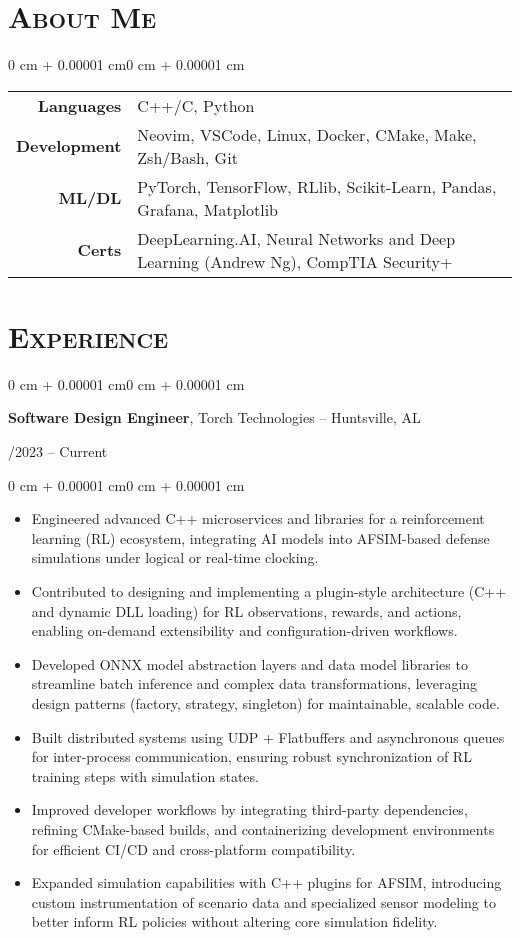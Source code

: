 \documentclass[11pt, letterpaper]{article}
\newenvironment{highlights}{
    \begin{itemize}[
        topsep=0.10 cm,
        parsep=0.10 cm,
        partopsep=0pt,
        itemsep=0pt,
        leftmargin=0.4 cm + 10pt
    ]
}{
    \end{itemize}
}
\newenvironment{onecolentry}{
    \begin{adjustwidth}{0 cm + 0.00001 cm}{0 cm + 0.00001 cm}
}{
    \end{adjustwidth}
}
\newenvironment{twocolentry}[1]{
    \onecolentry
    \def\secondColumn{#1}
    \setcolumnwidth{\fill,4.5cm}
    \begin{paracol}{2}
}{
    \switchcolumn \raggedleft \secondColumn
    \end{paracol}
    \endonecolentry
}
\begin{document}
\section{\scshape About Me}

\begin{onecolentry}
\begin{tabular}{@{}r l@{}}
\textbf{Languages} & C++/C, Python \\
\textbf{Development} & Neovim, VSCode, Linux, Docker, CMake, Make, Zsh/Bash, Git \\
\textbf{ML/DL} & PyTorch, TensorFlow, RLlib, Scikit-Learn, Pandas, Grafana, Matplotlib \\
\textbf{Certs} & DeepLearning.AI, Neural Networks and Deep Learning (Andrew Ng), CompTIA Security+ \\
\end{tabular}
\end{onecolentry}


\section{\scshape Experience}

\begin{twocolentry}{05/2023 – Current}
    \textbf{Software Design Engineer}, Torch Technologies -- Huntsville, AL
\end{twocolentry}

\vspace{0.10 cm}
\begin{onecolentry}
    \begin{highlights}
        \item Engineered advanced C++ microservices and libraries for a reinforcement learning (RL) ecosystem, integrating AI models into AFSIM-based defense simulations under logical or real-time clocking.
        \item Contributed to designing and implementing a plugin-style architecture (C++ and dynamic DLL loading) for RL observations, rewards, and actions, enabling on-demand extensibility and configuration-driven workflows.
        \item Developed ONNX model abstraction layers and data model libraries to streamline batch inference and complex data transformations, leveraging design patterns (factory, strategy, singleton) for maintainable, scalable code.
        \item Built distributed systems using UDP + Flatbuffers and asynchronous queues for inter-process communication, ensuring robust synchronization of RL training steps with simulation states.
        \item Improved developer workflows by integrating third-party dependencies, refining CMake-based builds, and containerizing development environments for efficient CI/CD and cross-platform compatibility.
        \item Expanded simulation capabilities with C++ plugins for AFSIM, introducing custom instrumentation of scenario data and specialized sensor modeling to better inform RL policies without altering core simulation fidelity.
    \end{highlights}
\end{onecolentry}
\end{document}
